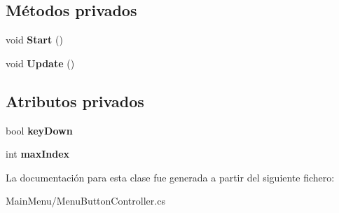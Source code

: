 \subsection*{Métodos privados}
\begin{DoxyCompactItemize}
\item 
\mbox{\label{class_menu_button_controller_a7ae528826025d0ee01078d6bbb6adaeb}} 
void {\bfseries Start} ()
\item 
\mbox{\label{class_menu_button_controller_a4d14bb5d61bc0e2ab0470f8477539640}} 
void {\bfseries Update} ()
\end{DoxyCompactItemize}
\subsection*{Atributos privados}
\begin{DoxyCompactItemize}
\item 
\mbox{\label{class_menu_button_controller_a1eec2959d3af9723da01dc2967bdc7fe}} 
bool {\bfseries key\+Down}
\item 
\mbox{\label{class_menu_button_controller_a78cd4628b0f8d52647f9f81ccad98470}} 
int {\bfseries max\+Index}
\end{DoxyCompactItemize}


La documentación para esta clase fue generada a partir del siguiente fichero\+:\begin{DoxyCompactItemize}
\item 
Main\+Menu/Menu\+Button\+Controller.\+cs\end{DoxyCompactItemize}
